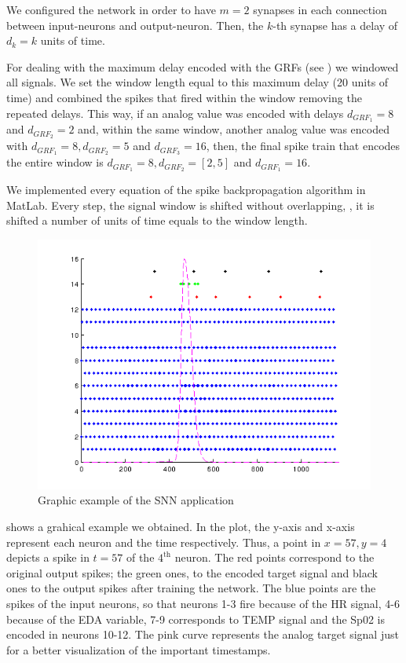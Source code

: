 We configured the network in order to have $m=2$ synapses in each connection between input-neurons and output-neuron. Then, the $k$-th synapse has a delay of $d_{k}=k$ units of time.

For dealing with the maximum delay encoded with the GRFs (see ) we windowed all signals. We set the window length equal to this maximum delay (20 units of time) and combined the spikes that fired within the window removing the repeated delays. This way, if an analog value was encoded with delays $d_{GRF_{1}}=8$ and $d_{GRF_{2}}=2$ and, within the same window, another analog value was encoded with $d_{GRF_{1}}=8,d_{GRF_{2}}=5$ and $d_{GRF_{3}}=16$, then, the final spike train that encodes the entire window is $d_{GRF_{1}}=8, d_{GRF_{2}}=[2,5]$ and $d_{GRF_{1}}=16$. 

We implemented every equation of the spike backpropagation algorithm in MatLab. Every step, the signal window is shifted without overlapping, \ie, it is shifted a number of units of time equals to the window length. 

\begin{figure}[!ht]
\centering
\includegraphics[width=0.85\columnwidth]{images/results/snn1.png}
\caption{Graphic example of the SNN application}
\label{fig:snnResults}
\end{figure}

 shows a grahical example we obtained. In the plot, the y-axis and x-axis represent each neuron and the time respectively. Thus, a point in $x=57, y=4$ depicts a spike in $t=57$ of the $4^{\text{th}}$ neuron. The red points correspond to the original output spikes; the green ones, to the encoded target signal and black ones to the output spikes after training the network. The blue points are the spikes of the input neurons, so that neurons 1-3 fire because of the HR signal, 4-6 because of the EDA variable, 7-9 corresponds to TEMP signal and the Sp02 is encoded in neurons 10-12. The pink curve represents the analog target signal just for a better visualization of the important timestamps.

